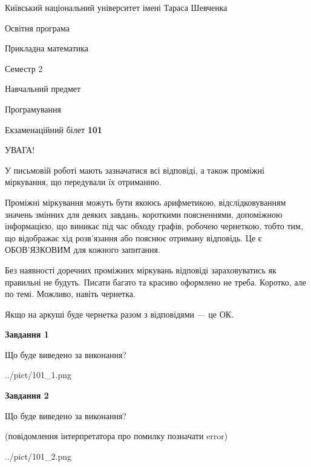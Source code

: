 \documentclass[12pt, ukrainian]{article}
\begin{document}
{{\begin {small}\par
{ \center  Київський національний університет імені Тараса Шевченка \par}
{\parbox {5 cm}{Освітня програма \hfill}{\parbox {7 cm}{Прикладна математика\hfill}}\parbox {6 cm}{\hfill Семестр 2}}\par
{\parbox {5 cm} {Навчальний предмет \hfill}\parbox {7 cm}{Програмування \hfill}\parbox {6cm}{\hfill}\par}\vspace{-7pt} \end{small}}{\center Екзаменаційний білет \No \textbf
{ 101 }\par}}
{
\begin {large}
УВАГА!

У письмовій роботі мають зазначатися всі відповіді, а також проміжні міркування, що передували їх отриманню.

Проміжні міркування можуть бути якоюсь арифметикою, відслідковуванням зна\-чень змінних для деяких завдань,
короткими поясненнями, допоміжною інформацією, що виникає під час обходу графів, робочею чернеткою,
тобто тим, що відображає хід розв’язання або пояснює отриману відповідь.
Це є ОБОВ’ЯЗКОВИМ для кожного запитання.

Без наявності доречних проміжних міркувань відповіді зараховуватись як правиль\-ні не будуть.
Писати багато та красиво оформлено не треба. Коротко, але по темі. Можли\-во, навіть чернетка.

Якщо на аркуші буде чернетка разом з відповідями --- це ОК.

\newpage

{\begin {center}\textbf{Завдання 1}\end {center}}\par
Що буде виведено за виконання?\par
\begin{center}
	{../pict/101_1.png}
\end{center}
\newpage

{\begin {center}\textbf{Завдання 2}\end {center}}\par
Що буде виведено за виконання?\par
 (повідомлення інтерпретатора про помилку позначати error)\par
\begin{center}
	{../pict/101_2.png}
\end{center}
\newpage


\end{large}}
\end{document}
